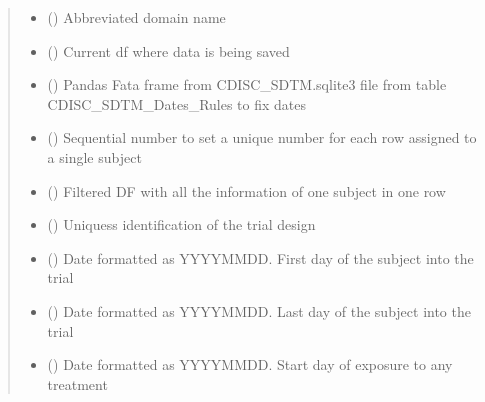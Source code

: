 \documentclass[letterpaper,10pt,english]{sphinxmanual}
\begin{document}
\begin{fulllineitems}
\begin{quote}
\begin{description}
\begin{itemize}
\item {} 
\sphinxAtStartPar
{} () \textendash{} Abbreviated domain name

\item {} 
\sphinxAtStartPar
{} () \textendash{} Current df where data is being saved

\item {} 
\sphinxAtStartPar
{} () \textendash{} Pandas Fata frame from CDISC\_SDTM.sqlite3 file from table CDISC\_SDTM\_Dates\_Rules to fix dates

\item {} 
\sphinxAtStartPar
{} () \textendash{} Sequential number to set a unique number for each row assigned to a single subject

\item {} 
\sphinxAtStartPar
{} () \textendash{} Filtered DF with all the information of one subject in one row

\item {} 
\sphinxAtStartPar
{} () \textendash{} Uniquess identification of the trial design

\item {} 
\sphinxAtStartPar
{} () \textendash{} Date formatted as YYYY\sphinxhyphen{}MM\sphinxhyphen{}DD. First day of the subject into the trial

\item {} 
\sphinxAtStartPar
{} () \textendash{} Date formatted as YYYY\sphinxhyphen{}MM\sphinxhyphen{}DD. Last day of the subject into the trial

\item {} 
\sphinxAtStartPar
{} () \textendash{} Date formatted as YYYY\sphinxhyphen{}MM\sphinxhyphen{}DD. Start day of exposure to any treatment


\end{itemize}
\end{description}
\end{quote}
\end{fulllineitems}
\end{document}

